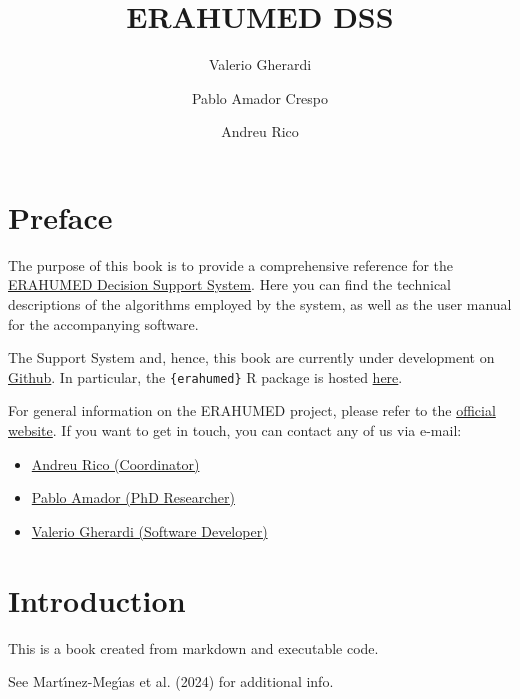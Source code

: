 \documentclass[
  letterpaper,
  DIV=11,
  numbers=noendperiod]{scrreprt}
\title{ERAHUMED DSS}
\author{Valerio Gherardi \and Pablo Amador Crespo \and Andreu Rico}
\date{}
\providecommand{\tightlist}{%
  \setlength{\itemsep}{0pt}\setlength{\parskip}{0pt}}\usepackage{longtable,booktabs,array}
\renewcommand*\contentsname{Table of contents}
\newcommand\contentsname{Table of contents}
\begin{document}
\maketitle

\renewcommand*\contentsname{Table of contents}
{
\hypersetup{linkcolor=}
\setcounter{tocdepth}{2}
\tableofcontents
}


\chapter*{Preface}\label{preface}


The purpose of this book is to provide a comprehensive reference for the
\href{https://www.erahumed.com/decision-support-system/}{ERAHUMED
Decision Support System}. Here you can find the technical descriptions
of the algorithms employed by the system, as well as the user manual for
the accompanying software.

The Support System and, hence, this book are currently under development
on \href{https://github.com/erahumed}{Github}. In particular, the
\texttt{\{erahumed\}} R package is hosted
\href{https://github.com/erahumed/erahumed}{here}.

For general information on the ERAHUMED project, please refer to the
\href{https://www.erahumed.com/}{official website}. If you want to get
in touch, you can contact any of us via e-mail:

\begin{itemize}
\tightlist
\item
  \href{mailto:andreu.rico@uv.es}{Andreu Rico (Coordinator)}
\item
  \href{mailto:pamadorc@gmail.com}{Pablo Amador (PhD Researcher)}
\item
  \href{mailto:vgherard840@gmail.com}{Valerio Gherardi (Software
  Developer)}
\end{itemize}


\chapter{Introduction}\label{introduction}

This is a book created from markdown and executable code.

See Martı́nez-Megı́as et al. (2024) for additional info.
\end{document}
